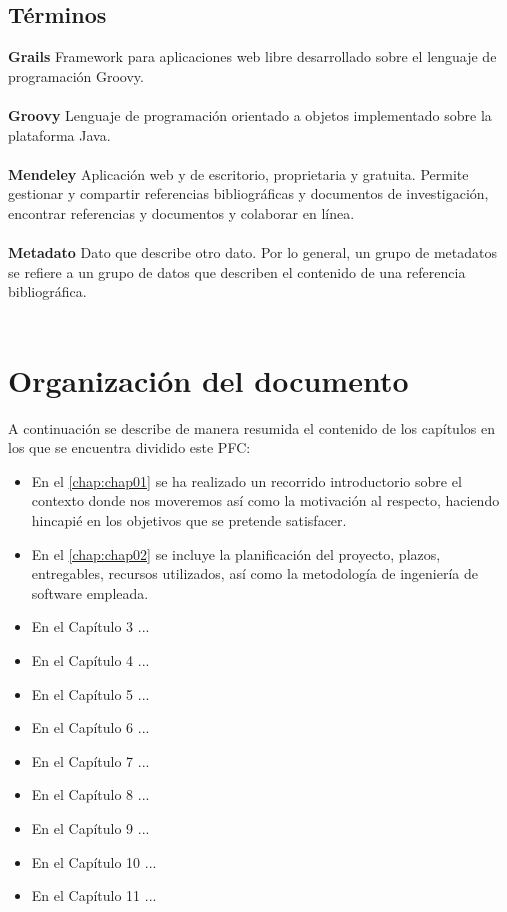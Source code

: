 \subsection{Términos}
\textbf{Grails}	Framework para aplicaciones web libre desarrollado sobre el lenguaje de programación Groovy.\\\\
\textbf{Groovy}	Lenguaje de programación orientado a objetos implementado sobre la plataforma Java.\\\\
\textbf{Mendeley}	Aplicación web y de escritorio, proprietaria y gratuita. Permite gestionar y compartir referencias bibliográficas y documentos de investigación, encontrar referencias y documentos y colaborar en línea.\\\\
\textbf{Metadato}	Dato que describe otro dato. Por lo general, un grupo de metadatos se refiere a un grupo de datos que describen el contenido de una referencia bibliográfica.\\\\

\section{Organización del documento}
A continuación se describe de manera resumida el contenido de los capítulos en los que se encuentra dividido este PFC:

\begin{itemize}
	\item En el \autoref{chap:chap01} se ha realizado un recorrido introductorio sobre el contexto donde nos moveremos así como la motivación al respecto, haciendo hincapié en los objetivos que se pretende satisfacer.
	\item En el \autoref{chap:chap02} se incluye la planificación del proyecto, plazos, entregables, recursos utilizados, así como la metodología de ingeniería de software empleada.
	\item En el Capítulo 3 ...
	\item En el Capítulo 4 ...
	\item En el Capítulo 5 ...
	\item En el Capítulo 6 ...
	\item En el Capítulo 7 ...
	\item En el Capítulo 8 ...
	\item En el Capítulo 9 ...
	\item En el Capítulo 10 ...
	\item En el Capítulo 11 ...
\end{itemize}

